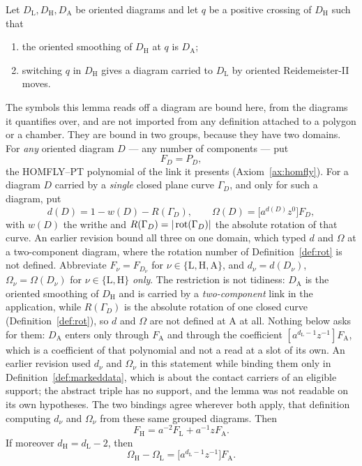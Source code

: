 \begin{lemma}\label{lem:fulltwist}
Let $D_{\mathrm L},D_{\mathrm H},D_{\mathrm A}$ be oriented diagrams and let $q$
be a positive crossing of $D_{\mathrm H}$ such that
\begin{enumerate}
\item[(T1)] the oriented smoothing of $D_{\mathrm H}$ at $q$ is
$D_{\mathrm A}$;
\item[(T2)] switching $q$ in $D_{\mathrm H}$ gives a diagram carried to
$D_{\mathrm L}$ by oriented Reidemeister-II moves.
\end{enumerate}
The symbols this lemma reads off a diagram are bound here, from the diagrams it
quantifies over, and are not imported from any definition attached to a polygon
or a chamber. They are bound in two groups, because they have two domains. For
\emph{any} oriented diagram $D$ --- any number of components --- put
\[
   F_D=P_D ,
\]
the HOMFLY--PT polynomial of the link it presents (Axiom~\ref{ax:homfly}). For
a diagram $D$ carried by a \emph{single} closed plane curve $\Gamma_D$, and
only for such a diagram, put
\[
   d(D)=1-w(D)-R(\Gamma_D),\qquad
   \Omega(D)=\bigl[a^{d(D)}z^0\bigr]F_D ,
\]
with $w(D)$ the writhe and $R(\Gamma_D)=|\operatorname{rot}(\Gamma_D)|$ the absolute
rotation of that curve. An earlier revision bound all three on one domain,
which typed $d$ and $\Omega$ at a two-component diagram, where the rotation
number of Definition~\ref{def:rot} is not defined. Abbreviate $F_\nu=F_{D_\nu}$ for $\nu\in\{\mathrm L,\mathrm H,\mathrm A\}$,
and $d_\nu=d(D_\nu)$, $\Omega_\nu=\Omega(D_\nu)$ for
$\nu\in\{\mathrm L,\mathrm H\}$ \emph{only}. The restriction is not tidiness:
$D_{\mathrm A}$ is the oriented smoothing of $D_{\mathrm H}$ and is carried by a
\emph{two-component} link in the application, while $R(\Gamma_D)$ is the
absolute rotation of one closed curve (Definition~\ref{def:rot}), so $d$ and
$\Omega$ are not defined at $\mathrm A$ at all. Nothing below asks for them:
$D_{\mathrm A}$ enters only through $F_{\mathrm A}$ and through the coefficient
$[a^{d_{\mathrm L}-1}z^{-1}]F_{\mathrm A}$, which is a coefficient of that
polynomial and not a read at a slot of its own. An
earlier revision used $d_\nu$ and $\Omega_\nu$ in this statement while binding
them only in Definition~\ref{def:markeddata}, which is about the contact
carriers of an eligible support; the abstract triple has no support, and the
lemma was not readable on its own hypotheses. The two bindings agree wherever
both apply, that definition computing $d_\nu$ and $\Omega_\nu$ from these same
grouped diagrams. Then
\[
   F_{\mathrm H}=a^{-2}F_{\mathrm L}+a^{-1}zF_{\mathrm A}.
\]
If moreover $d_{\mathrm H}=d_{\mathrm L}-2$, then
\[
   \Omega_{\mathrm H}-\Omega_{\mathrm L}
   =\bigl[a^{d_{\mathrm L}-1}z^{-1}\bigr]F_{\mathrm A}.
\]
\end{lemma}
